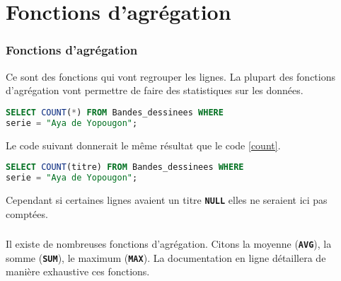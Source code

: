 \documentclass[svgnames,11pt]{beamer}
\begin{document}
\section{Fonctions d'agrégation}
\begin{frame}[fragile]
    \frametitle{Fonctions d'agrégation}

    Ce sont des fonctions qui vont regrouper les lignes. La plupart des fonctions d'agrégation vont permettre de faire des statistiques sur les données. 
\begin{center}
\begin{lstlisting}[language=SQL , basicstyle=\ttfamily\small, xleftmargin=1em, xrightmargin=0em]
SELECT COUNT(*) FROM Bandes_dessinees WHERE 
serie = "Aya de Yopougon";
\end{lstlisting}
\label{count}
\end{center}    

\end{frame}
\begin{frame}[fragile]

\begin{aretenir}[Remarque]
Le code suivant donnerait le même résultat que le code \ref{count}.
\begin{lstlisting}[language=SQL , basicstyle=\ttfamily\small, xleftmargin=1em, xrightmargin=0em]
SELECT COUNT(titre) FROM Bandes_dessinees WHERE 
serie = "Aya de Yopougon";
\end{lstlisting}
Cependant si certaines lignes avaient un titre \textbf{\texttt{NULL}} elles ne seraient ici pas comptées.
\end{aretenir} 

\end{frame}
\begin{frame}
    \frametitle{}

    Il existe de nombreuses fonctions d'agrégation. Citons la moyenne (\texttt{\textbf{AVG}}), la somme (\texttt{\textbf{SUM}}), le maximum (\texttt{\textbf{MAX}}). La documentation en ligne détaillera de manière exhaustive ces fonctions.

\end{frame}
\end{document}
